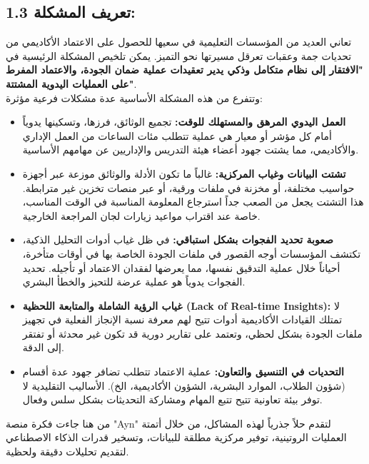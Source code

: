\documentclass[12pt, a4paper]{report}
\begin{document}
\begin{english}
\section*{1.3 تعريف المشكلة:}

تعاني العديد من المؤسسات التعليمية في سعيها للحصول على الاعتماد الأكاديمي من تحديات جمة وعقبات تعرقل مسيرتها نحو التميز. يمكن تلخيص المشكلة الرئيسية في \textbf{"الافتقار إلى نظام متكامل وذكي يدير تعقيدات عملية ضمان الجودة، والاعتماد المفرط على العمليات اليدوية المشتتة"}. \\

وتتفرع من هذه المشكلة الأساسية عدة مشكلات فرعية مؤثرة: \\
\begin{itemize}
\item \textbf{العمل اليدوي المرهق والمستهلك للوقت:} تجميع الوثائق، فرزها، وتسكينها يدوياً أمام كل مؤشر أو معيار هي عملية تتطلب مئات الساعات من العمل الإداري والأكاديمي، مما يشتت جهود أعضاء هيئة التدريس والإداريين عن مهامهم الأساسية.
\item \textbf{تشتت البيانات وغياب المركزية:} غالباً ما تكون الأدلة والوثائق موزعة عبر أجهزة حواسيب مختلفة، أو مخزنة في ملفات ورقية، أو عبر منصات تخزين غير مترابطة. هذا التشتت يجعل من الصعب جداً استرجاع المعلومة المناسبة في الوقت المناسب، خاصة عند اقتراب مواعيد زيارات لجان المراجعة الخارجية.
\item \textbf{صعوبة تحديد الفجوات بشكل استباقي:} في ظل غياب أدوات التحليل الذكية، تكتشف المؤسسات أوجه القصور في ملفات الجودة الخاصة بها في أوقات متأخرة، أحياناً خلال عملية التدقيق نفسها، مما يعرضها لفقدان الاعتماد أو تأجيله. تحديد الفجوات يدوياً هو عملية عرضة للتحيز والخطأ البشري.
\item \textbf{غياب الرؤية الشاملة والمتابعة اللحظية (Lack of Real-time Insights):} لا تمتلك القيادات الأكاديمية أدوات تتيح لهم معرفة نسبة الإنجاز الفعلية في تجهيز ملفات الجودة بشكل لحظي، وتعتمد على تقارير دورية قد تكون غير محدثة أو تفتقر إلى الدقة.
\item \textbf{التحديات في التنسيق والتعاون:} عملية الاعتماد تتطلب تضافر جهود عدة أقسام (شؤون الطلاب، الموارد البشرية، الشؤون الأكاديمية، الخ). الأساليب التقليدية لا توفر بيئة تعاونية تتيح تتبع المهام ومشاركة التحديثات بشكل سلس وفعال.
\end{itemize}

من هنا جاءت فكرة منصة "Ayn" لتقدم حلاً جذرياً لهذه المشاكل، من خلال أتمتة العمليات الروتينية، توفير مركزية مطلقة للبيانات، وتسخير قدرات الذكاء الاصطناعي لتقديم تحليلات دقيقة ولحظية. \\


\end{english}
\end{document}
